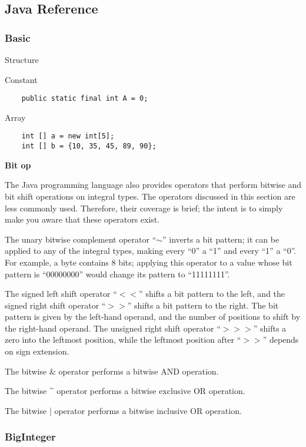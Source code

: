 \subsection{Java Reference}

\subsubsection{Basic}

Structure


Constant
\begin{lstlisting}
    public static final int A = 0;
\end{lstlisting}

Array
\begin{lstlisting}
    int [] a = new int[5];
    int [] b = {10, 35, 45, 89, 90};
\end{lstlisting}

\textbf{Bit op}

The Java programming language also provides operators that perform bitwise and bit shift operations on integral types. The operators discussed in this section are less commonly used. Therefore, their coverage is brief; the intent is to simply make you aware that these operators exist.

The unary bitwise complement operator ``$\sim$'' inverts a bit pattern; it can be applied to any of the integral types, making every ``0'' a ``1'' and every ``1'' a ``0''. For example, a byte contains 8 bits; applying this operator to a value whose bit pattern is ``00000000'' would change its pattern to ``11111111''.

The signed left shift operator ``$<<$'' shifts a bit pattern to the left, and the signed right shift operator ``$>>$'' shifts a bit pattern to the right. The bit pattern is given by the left-hand operand, and the number of positions to shift by the right-hand operand. The unsigned right shift operator ``$>>>$'' shifts a zero into the leftmost position, while the leftmost position after ``$>>$'' depends on sign extension.

The bitwise \& operator performs a bitwise AND operation.

The bitwise $\^$ operator performs a bitwise exclusive OR operation.

The bitwise | operator performs a bitwise inclusive OR operation.

\subsubsection{BigInteger}

